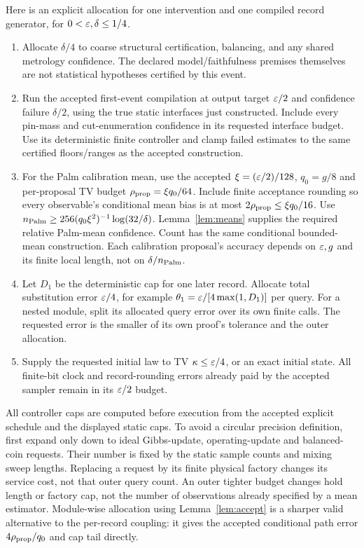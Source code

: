 Here is an explicit allocation for one intervention and one compiled
record generator, for $0<\varepsilon,\delta\le1/4$.
\begin{enumerate}
\item Allocate $\delta/4$ to coarse structural certification, balancing,
and any shared metrology confidence. The declared model/faithfulness
premises themselves are not statistical hypotheses certified by this event.
\item Run the accepted first-event compilation at output target $\varepsilon/2$
and confidence failure $\delta/2$, using the true static interfaces just
constructed. Include every pin-mass and cut-enumeration confidence in
its requested interface budget. Use its deterministic finite controller
and clamp failed estimates to the same certified floors/ranges as the
accepted construction.
\item For the Palm calibration mean, use the accepted
$\xi=(\varepsilon/2)/128$, $q_0=g/8$ and per-proposal TV budget
$\rho_{\rm prop}=\xi q_0/64$. Include finite acceptance rounding
so every observable's conditional mean bias is at most
$2\rho_{\rm prop}\le\xi q_0/16$. Use
$n_{\rm Palm}\ge256(q_0\xi^2)^{-1}\log(32/\delta)$.
Lemma~\ref{lem:means} supplies the required relative Palm-mean confidence.
Count has the same conditional bounded-mean construction.
Each calibration proposal's accuracy depends on $\varepsilon,g$ and its finite
local length, not on $\delta/n_{\rm Palm}$.
\item Let $D_1$ be the deterministic cap for one later record. Allocate
total substitution error $\varepsilon/4$, for example
$\theta_1=\varepsilon/[4\max(1,D_1)]$ per query. For a nested module, split its
allocated query error over its own finite calls. The requested error is
the smaller of its own proof's tolerance and the outer allocation.
\item Supply the requested initial law to TV $\kappa\le\varepsilon/4$, or an
exact initial state. All finite-bit clock and record-rounding errors
already paid by the accepted sampler remain in its $\varepsilon/2$ budget.
\end{enumerate}
All controller caps are computed before execution from the accepted
explicit schedule and the displayed static caps. To avoid a circular
precision definition, first expand only down to ideal Gibbs-update,
operating-update and balanced-coin requests. Their number is fixed by
the static sample counts and mixing sweep lengths. Replacing a request
by its finite physical factory changes its service cost, not that outer
query count. An outer tighter budget changes hold length or factory cap,
not the number of observations already specified by a mean estimator.
Module-wise allocation using Lemma~\ref{lem:accept} is a sharper valid
alternative to the per-record coupling: it gives the accepted conditional
path error $4\rho_{\rm prop}/q_0$ and cap tail directly.

